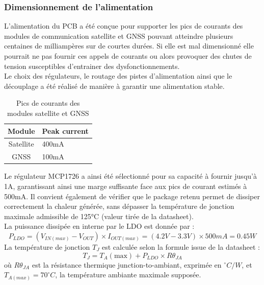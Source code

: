 \documentclass[12pt]{article}
\begin{document}
\subsubsection{Dimensionnement de l'alimentation}
L'alimentation du PCB a été conçue pour supporter les pics de courants des modules de communication satellite et GNSS pouvant atteindre plusieurs centaines de milliampères sur de courtes durées. Si elle est mal dimensionné elle pourrait ne pas fournir ces appels de courants ou alors provoquer des chutes de tension susceptibles d'entrainer des dysfonctionnements. \\
Le choix des régulateurs, le routage des pistes d'alimentation ainsi que le découplage a été réalisé de manière à garantir une alimentation stable. \\


\begin{table}[h]
\centering
\caption{Pics de courants des modules satellite et GNSS}
\begin{tabular}{|c|l|}
\hline
\textbf{Module} & \textbf{Peak current} \\ 
\hline\hline
Satellite & 400mA \\
GNSS & 100mA \\
\hline
\end{tabular}
\label{tab:peak_current}
\end{table}

Le régulateur MCP1726 a ainsi été sélectionné pour sa capacité à fournir jusqu'à 1A, garantissant ainsi une marge suffisante face aux pics de courant estimés à 500mA. Il convient également de vérifier que le package retenu permet de dissiper correctement la chaleur générée, sans dépasser la température de jonction maximale admissible de 125°C (valeur tirée de la datasheet). \\ 

\noindent La puissance dissipée en interne par le LDO est donnée par :
\begin{equation}\label{eq:pLDO}
	P_{LDO} = (V_{IN(max)} - V_{OUT}) \times I_{OUT(max)} = (4.2V - 3.3V) \times 500mA = 0.45W	
\end{equation}
La température de jonction $T_J$ est calculée selon la formule issue de la datasheet :
\begin{equation}\label{eq:tj}
    T_J = T_A(\text{max}) + P_{LDO} \times R\theta_{JA}
\end{equation}
où $R\theta_{JA}$ est la résistance thermique junction-to-ambiant, exprimée en $^{\circ}C/W$, et $T_{A(max)}= 70^{\circ}C$, la température ambiante maximale supposée. \\
\end{document}
